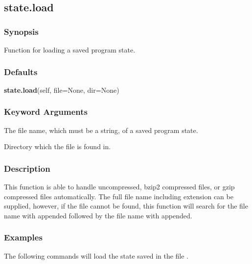 \subsection{state.load}


\subsubsection{Synopsis}

Function for loading a saved program state.



\subsubsection{Defaults}

\textsf{\textbf{state.load}(self, file=None, dir=None)}


\subsubsection{Keyword Arguments}

  The file name, which must be a string, of a saved program state. 

  Directory which the file is found in. 




\subsubsection{Description}

This function is able to handle uncompressed, bzip2 compressed files, or gzip compressed files automatically.  The full file name including extension can be supplied, however, if the file cannot be found, this function will search for the file name with  appended followed by the file name with  appended.



\subsubsection{Examples}

The following commands will load the state saved in the file .




